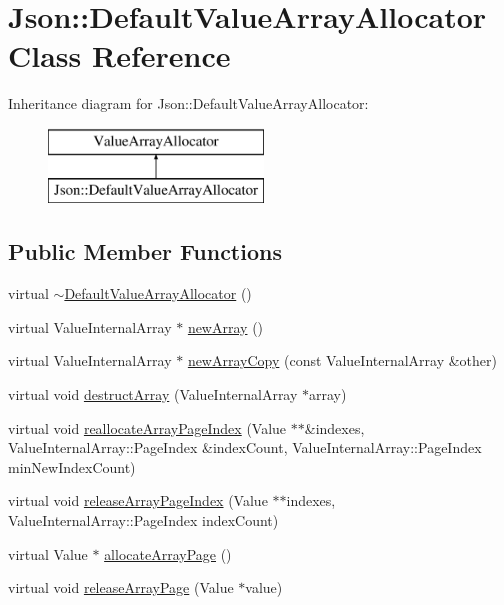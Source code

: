 \hypertarget{classJson_1_1DefaultValueArrayAllocator}{}\section{Json\+:\+:Default\+Value\+Array\+Allocator Class Reference}
\label{classJson_1_1DefaultValueArrayAllocator}
Inheritance diagram for Json\+:\+:Default\+Value\+Array\+Allocator\+:\begin{figure}[H]
\begin{center}
\leavevmode
\includegraphics[height=2.000000cm]{classJson_1_1DefaultValueArrayAllocator}
\end{center}
\end{figure}
\subsection*{Public Member Functions}
\begin{DoxyCompactItemize}
\item 
virtual \hyperlink{classJson_1_1DefaultValueArrayAllocator_a6425da69b74e9e9bcb6facfc42c22dc1}{$\sim$\+Default\+Value\+Array\+Allocator} ()
\item 
virtual Value\+Internal\+Array $\ast$ \hyperlink{classJson_1_1DefaultValueArrayAllocator_aa67b2e7d81bb435bb90597b93f0250e2}{new\+Array} ()
\item 
virtual Value\+Internal\+Array $\ast$ \hyperlink{classJson_1_1DefaultValueArrayAllocator_a6205873711ed05741db9ab78cdf59012}{new\+Array\+Copy} (const Value\+Internal\+Array \&other)
\item 
virtual void \hyperlink{classJson_1_1DefaultValueArrayAllocator_ad15925b6db4dc1d14a9217ad79d80003}{destruct\+Array} (Value\+Internal\+Array $\ast$array)
\item 
virtual void \hyperlink{classJson_1_1DefaultValueArrayAllocator_a69cba7e7c19d2b1f95aa5175bf212e18}{reallocate\+Array\+Page\+Index} (Value $\ast$$\ast$\&indexes, Value\+Internal\+Array\+::\+Page\+Index \&index\+Count, Value\+Internal\+Array\+::\+Page\+Index min\+New\+Index\+Count)
\item 
virtual void \hyperlink{classJson_1_1DefaultValueArrayAllocator_aefbf1f26ad3389cc6678682b19e3148b}{release\+Array\+Page\+Index} (Value $\ast$$\ast$indexes, Value\+Internal\+Array\+::\+Page\+Index index\+Count)
\item 
virtual Value $\ast$ \hyperlink{classJson_1_1DefaultValueArrayAllocator_a8a6cbdc03ee2ee92299eea59c221e843}{allocate\+Array\+Page} ()
\item 
virtual void \hyperlink{classJson_1_1DefaultValueArrayAllocator_a59da528d5911a509c20943a25b450db3}{release\+Array\+Page} (Value $\ast$value)
\end{DoxyCompactItemize}


